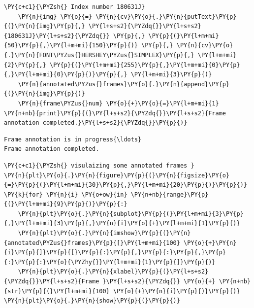 \documentclass[a4paper,11pt]{article}%
\begin{document}
\begin{tcolorbox}[breakable, size=fbox, boxrule=1pt, pad at break*=1mm,colback=cellbackground, colframe=cellborder]
\begin{Verbatim}[commandchars=\\\{\}]
    \PY{c+c1}{\PYZsh{} Index number 180631J}
    \PY{n}{img} \PY{o}{=} \PY{n}{cv}\PY{o}{.}\PY{n}{putText}\PY{p}{(}\PY{n}{img}\PY{p}{,} \PY{l+s+s2}{\PYZdq{}}\PY{l+s+s2}{180631J}\PY{l+s+s2}{\PYZdq{}} \PY{p}{,} \PY{p}{(}\PY{l+m+mi}{50}\PY{p}{,}\PY{l+m+mi}{150}\PY{p}{)} \PY{p}{,} \PY{n}{cv}\PY{o}{.}\PY{n}{FONT\PYZus{}HERSHEY\PYZus{}SIMPLEX}\PY{p}{,} \PY{l+m+mi}{2}\PY{p}{,} \PY{p}{(}\PY{l+m+mi}{255}\PY{p}{,}\PY{l+m+mi}{0}\PY{p}{,}\PY{l+m+mi}{0}\PY{p}{)}\PY{p}{,} \PY{l+m+mi}{3}\PY{p}{)}
    \PY{n}{annotated\PYZus{}frames}\PY{o}{.}\PY{n}{append}\PY{p}{(}\PY{n}{img}\PY{p}{)}
    \PY{n}{frame\PYZus{}num} \PY{o}{+}\PY{o}{=}\PY{l+m+mi}{1}
\PY{n+nb}{print}\PY{p}{(}\PY{l+s+s2}{\PYZdq{}}\PY{l+s+s2}{Frame annotation completed.}\PY{l+s+s2}{\PYZdq{}}\PY{p}{)}
\end{Verbatim}
\end{tcolorbox}

    \begin{Verbatim}[commandchars=\\\{\}]
Frame annotation is in progress{\ldots}
Frame annotation completed.
    \end{Verbatim}

    \begin{tcolorbox}[breakable, size=fbox, boxrule=1pt, pad at break*=1mm,colback=cellbackground, colframe=cellborder]
\begin{Verbatim}[commandchars=\\\{\}]
\PY{c+c1}{\PYZsh{} visulaizing some annotated frames }
\PY{n}{plt}\PY{o}{.}\PY{n}{figure}\PY{p}{(}\PY{n}{figsize}\PY{o}{=}\PY{p}{(}\PY{l+m+mi}{30}\PY{p}{,}\PY{l+m+mi}{20}\PY{p}{)}\PY{p}{)}
\PY{k}{for} \PY{n}{i} \PY{o+ow}{in} \PY{n+nb}{range}\PY{p}{(}\PY{l+m+mi}{9}\PY{p}{)}\PY{p}{:}
    \PY{n}{plt}\PY{o}{.}\PY{n}{subplot}\PY{p}{(}\PY{l+m+mi}{3}\PY{p}{,}\PY{l+m+mi}{3}\PY{p}{,}\PY{n}{i}\PY{o}{+}\PY{l+m+mi}{1}\PY{p}{)}
    \PY{n}{plt}\PY{o}{.}\PY{n}{imshow}\PY{p}{(}\PY{n}{annotated\PYZus{}frames}\PY{p}{[}\PY{l+m+mi}{100} \PY{o}{+}\PY{n}{i}\PY{p}{]}\PY{p}{[}\PY{p}{:}\PY{p}{,}\PY{p}{:}\PY{p}{,}\PY{p}{:}\PY{p}{:}\PY{o}{\PYZhy{}}\PY{l+m+mi}{1}\PY{p}{]}\PY{p}{)}
    \PY{n}{plt}\PY{o}{.}\PY{n}{xlabel}\PY{p}{(}\PY{l+s+s2}{\PYZdq{}}\PY{l+s+s2}{Frame }\PY{l+s+s2}{\PYZdq{}} \PY{o}{+} \PY{n+nb}{str}\PY{p}{(}\PY{l+m+mi}{100} \PY{o}{+}\PY{n}{i}\PY{p}{)}\PY{p}{)}
\PY{n}{plt}\PY{o}{.}\PY{n}{show}\PY{p}{(}\PY{p}{)}
\end{Verbatim}
\end{tcolorbox}
\end{document}
